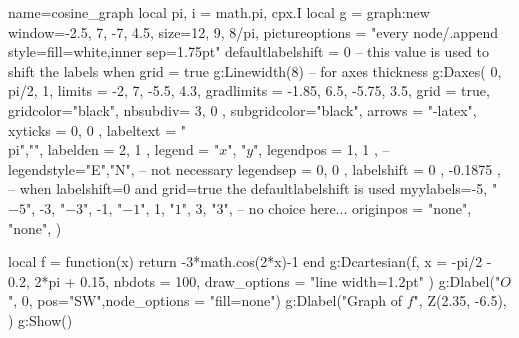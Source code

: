 \documentclass{standalone}
\begin{document}
\begin{luadraw}{name=cosine_graph}
    local pi, i = math.pi, cpx.I
    local g = graph:new{
        window={-2.5, 7, -7, 4.5}, size={12, 9, 8/pi},
        pictureoptions = "every node/.append style={fill=white,inner sep=1.75pt}"
    }
    defaultlabelshift = 0 -- this value is used to shift the labels when grid = true
    g:Linewidth(8) -- for axes thickness
    g:Daxes(
        {0, pi/2, 1}, 
        {
            limits = {{-2, 7}, {-5.5, 4.3}},
            gradlimits = {{-1.85, 6.5}, {-5.75, 3.5}},
            grid = true, gridcolor="black", 
            nbsubdiv={ 3, 0 }, subgridcolor="black",
            arrows = "-latex",
            xyticks = { 0, 0 },
            labeltext = {"\\pi",""},
            labelden = { 2, 1 },
            legend = {"$x$", "$y$"},
            legendpos = { 1, 1 },
            -- legendstyle={"E","N"}, -- not necessary
            legendsep = { 0, 0 },
            labelshift = { 0 , -0.1875 }, -- when labelshift=0 and grid=true the defaultlabelshift is used
            myylabels={-5, "$-5$", -3, "$-3$", -1, "$-1$", 1, "$1$", 3, "$3$"}, -- no choice here...
            originpos = {"none", "none"},
        }
    )

    local f = function(x) return -3*math.cos(2*x)-1 end
    g:Dcartesian(f, {
        x = {-pi/2 - 0.2, 2*pi + 0.15},
        nbdots = 100, draw_options = "line width=1.2pt"
    })
    g:Dlabel("$O$", 0, {pos="SW",node_options = "fill=none"})
    g:Dlabel("Graph of $f$", Z(2.35, -6.5), {})
    g:Show()
\end{luadraw}
\end{document}
